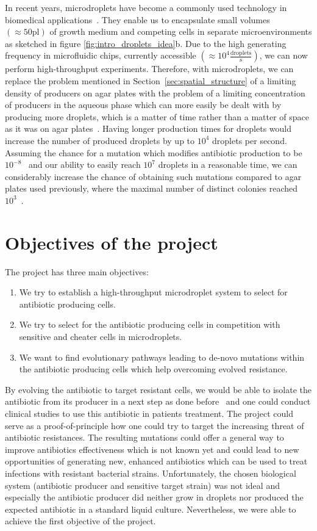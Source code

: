 In recent years, microdroplets have become a commonly used technology in biomedical applications~\cite{Zagnoni2011-ko}. They enable us to encapsulate small volumes $ \left( \approx 50 \mathrm{pl} \right)$ of growth medium and competing cells in separate microenvironments as sketched in figure \ref{fig:intro_droplets_idea}b. Due to the high generating frequency in microfluidic chips, currently accessible $\left( \approx 10^4 \frac{\mathrm{droplets}}{\mathrm{s}} \right) $, we can now perform high-throughput experiments.
Therefore, with microdroplets, we can replace the problem mentioned in Section~\ref{sec:spatial_structure} of a limiting density of producers on agar plates with the problem of a limiting concentration of producers in the aqueous phase which can more easily be dealt with by producing more droplets, which is a matter of time rather than a matter of space as it was on agar plates~\cite{Gerardin2016-ac}. Having longer production times for droplets would increase the number of produced droplets by up to $10^4$ droplets per second.
Assuming the chance for a mutation which modifies antibiotic production to be $10^{-8}$~\cite{Drake1998-es, Kunkel2004-br, Wielgoss2011-jd} and our ability to easily reach $10^7$ droplets in a reasonable time, we can considerably increase the chance of obtaining such mutations compared to agar plates used previously, where the maximal number of distinct colonies reached $10^3$~\cite{Gerardin2016-ac}.

\section{Objectives of the project}

The project has three main objectives:
\begin{enumerate}
    \item We try to establish a high-throughput microdroplet system to select for antibiotic producing cells.
    \item We try to select for the antibiotic producing cells in competition with sensitive and cheater cells in microdroplets.
    \item We want to find evolutionary pathways leading to de-novo mutations within the antibiotic producing cells which help overcoming evolved resistance.
\end{enumerate}
By evolving the antibiotic to target resistant cells, we would be able to isolate the antibiotic from its producer in a next step as done before~\cite{Singh2018-qp} and one could conduct clinical studies to use this antibiotic in patients treatment. The project could serve as a proof-of-principle how one could try to target the increasing threat of antibiotic resistances.
The resulting mutations could offer a general way to improve antibiotics effectiveness which is not known yet and could lead to new opportunities of generating new, enhanced antibiotics which can be used to treat infections with resistant bacterial strains.
Unfortunately, the chosen biological system (antibiotic producer and sensitive target strain) was not ideal and especially the antibiotic producer did neither grow in droplets nor produced the expected antibiotic in a standard liquid culture. Nevertheless, we were able to achieve the first objective of the project.

